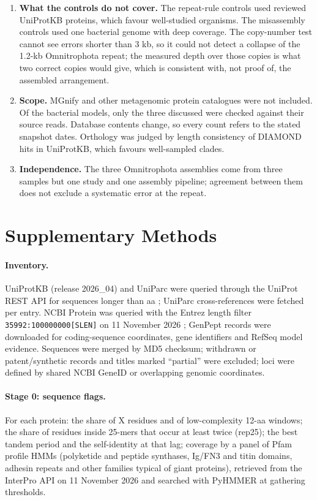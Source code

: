 \documentclass[11pt]{article}
\begin{document}
\begin{enumerate}[leftmargin=*]
\item \textbf{What the controls do not cover.} The repeat-rule controls used reviewed UniProtKB proteins, which favour
well-studied organisms. The misassembly controls used one bacterial genome with deep coverage. The copy-number test cannot
see errors shorter than 3 kb, so it could not detect a collapse of the 1.2-kb Omnitrophota repeat; the measured depth over
those copies is what two correct copies would give, which is consistent with, not proof of, the assembled arrangement.
\item \textbf{Scope.} MGnify and other metagenomic protein catalogues were not included. Of the bacterial models, only the
three discussed were checked against their source reads. Database contents change, so every count refers to the stated
snapshot dates. Orthology was judged by length consistency of DIAMOND hits in UniProtKB, which favours well-sampled clades.
\item \textbf{Independence.} The three Omnitrophota assemblies come from three samples but one study and one assembly
pipeline; agreement between them does not exclude a systematic error at the repeat.
\end{enumerate}

\section*{Supplementary Methods}

\paragraph{Inventory.} UniProtKB (release 2026\_04) and UniParc were queried through the UniProt REST API for sequences
longer than  aa \citep{uniprot2025}; UniParc cross-references were fetched per entry. NCBI Protein was queried
with the Entrez length filter \texttt{35992:100000000[SLEN]} on 11 November 2026 \citep{sayers2026,oleary2016}; GenPept
records were downloaded for coding-sequence coordinates, gene identifiers and RefSeq model evidence. Sequences were merged
by MD5 checksum; withdrawn or patent/synthetic records and titles marked ``partial'' were excluded; loci were defined by
shared NCBI GeneID or overlapping genomic coordinates.

\paragraph{Stage 0: sequence flags.} For each protein: the share of X residues and of low-complexity 12-aa windows; the
share of residues inside 25-mers that occur at least twice (rep25); the best tandem period and the self-identity at that
lag; coverage by a panel of  Pfam profile HMMs \citep{mistry2021} (polyketide and peptide synthases, Ig/FN3
and titin domains, adhesin repeats and other families typical of giant proteins), retrieved from the InterPro API on
11 November 2026 and searched with PyHMMER \citep{eddy2011,larralde2023} at gathering thresholds.
\end{document}
